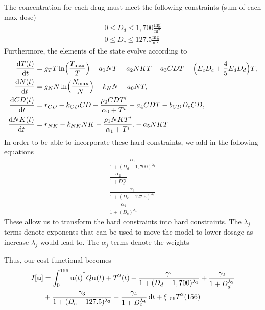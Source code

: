 \documentclass[12pt]{article}
\begin{document}
The concentration for each drug must meet the following constraints (sum of each max dose)
\begin{align*}
	0 \le D_d \le 1,700 \frac{\text{mg}}{\text{m}^2} \\
	0 \le D_c \le 127.5 \frac{\text{mg}}{\text{m}^2}
\end{align*}
Furthermore, the elements of the state evolve according to 
\begin{align*}
	\frac{\diff T(t)}{\diff t} &= g_T T \ln \Bigl( \frac{T_{\max}}{T} \Bigr)- a_1NT - a_2NKT - a_3CDT - \Bigl(E_c D_c +\frac{4}{5}E_d D_d \Bigr)T, \\
	\frac{\diff N(t)}{\diff t} &= g_N N \ln\Bigl(\frac{N_{\max}}{N} \Bigr) - k_N N - a_0NT, \\
	\frac{\diff CD(t)}{\diff t} &= r_{CD} - k_{CD} CD - \frac{\rho_0 CDT ^ i}{\alpha_0 + T^i} - a_4CDT - b_{CD}D_cCD, \\
	\frac{\diff NK(t)}{\diff t} &=r_{NK} - k_{NK} NK - \frac{\rho _1NKT^i}{\alpha_1 + T^i}. - a_5 NK T\\
\end{align*}
In order to be able to incorporate these hard constraints, we add in the following equations
\begin{align*}
	\frac{\alpha_1}{1 + (D_d - 1,700)^{\lambda_1}} \\
	\frac{\alpha_2}{1 + D_d ^{\lambda_2}} \\
	\frac{\alpha_3}{1 + (D_c - 127.5)^{\lambda_3}} \\
	\frac{\alpha_4}{1 + (D_c)^{\lambda_4}}
\end{align*}
These allow us to transform the hard constraints into hard constraints.
The $\lambda_j$ terms denote exponents that can be used to move the model to lower dosage as increase $\lambda_j$ would lead to.
The $\alpha_j$ terms denote the weights

Thus, our cost functional becomes
\begin{align*}
	J[\mathbf{u}] &= \int_0^{156}\mathbf{u}(t)^{^{\mathsf T}} Q \mathbf{u}(t)+ T^2(t) + \frac{\gamma_1}{1 + (D_d - 1,700)^{\lambda_1}} + \frac{\gamma_2}{1 + D_d ^{\lambda_2}} \\
	                    &+ \frac{\gamma_3}{1 + (D_c - 127.5)^{\lambda_3}} + \frac{\gamma_4}{1 + D_c^{\lambda_4}} \mathop{}\!\mathrm{d} t + \xi_{156} T^2(156)
\end{align*}
\end{document}
